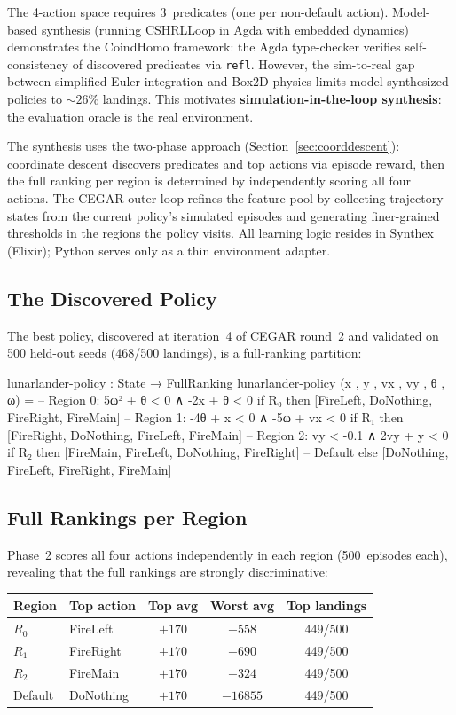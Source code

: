 \documentclass[9pt,a4paper]{article}
\theoremstyle{plain}
\theoremstyle{definition}
\theoremstyle{remark}
\begin{document}
The 4-action space requires 3~predicates (one per non-default action).
Model-based synthesis (running CSHRLLoop in Agda with embedded
dynamics) demonstrates the CoindHomo framework: the Agda type-checker
verifies self-consistency of discovered predicates via \texttt{refl}.
However, the sim-to-real gap between simplified Euler integration
and Box2D physics limits model-synthesized policies to
${\sim}26\%$ landings. This motivates \textbf{simulation-in-the-loop
synthesis}: the evaluation oracle is the real environment.

The synthesis uses the two-phase approach
(Section~\ref{sec:coorddescent}): coordinate descent discovers
predicates and top actions via episode reward, then the full
ranking per region is determined by independently scoring all
four actions. The CEGAR outer loop refines the feature pool by
collecting trajectory states from the current policy's simulated
episodes and generating finer-grained thresholds in the regions
the policy visits. All learning logic resides in Synthex (Elixir);
Python serves only as a thin environment adapter.

\subsection{The Discovered Policy}

The best policy, discovered at iteration~4 of CEGAR round~2
and validated on 500 held-out seeds (468/500 landings), is a
full-ranking partition:

\begin{spec}
lunarlander-policy : State → FullRanking
lunarlander-policy (x , y , vx , vy , θ , ω) =
  -- Region 0: 5ω² + θ < 0  ∧  -2x + θ < 0
  if R₀ then [FireLeft, DoNothing, FireRight, FireMain]
  -- Region 1: -4θ + x < 0  ∧  -5ω + vx < 0
  if R₁ then [FireRight, DoNothing, FireLeft, FireMain]
  -- Region 2: vy < -0.1  ∧  2vy + y < 0
  if R₂ then [FireMain, FireLeft, DoNothing, FireRight]
  -- Default
  else        [DoNothing, FireLeft, FireRight, FireMain]
\end{spec}

\subsection{Full Rankings per Region}

Phase~2 scores all four actions independently in each region
(500~episodes each), revealing that the full rankings are strongly
discriminative:

\begin{center}
\begin{tabular}{llccc}
\toprule
\textbf{Region} & \textbf{Top action} & \textbf{Top avg} & \textbf{Worst avg} & \textbf{Top landings} \\
\midrule
$R_0$ & FireLeft  & $+170$ & $-558$ & 449/500 \\
$R_1$ & FireRight & $+170$ & $-690$ & 449/500 \\
$R_2$ & FireMain  & $+170$ & $-324$ & 449/500 \\
Default & DoNothing & $+170$ & $-16855$ & 449/500 \\
\bottomrule
\end{tabular}
\end{center}
\end{document}
